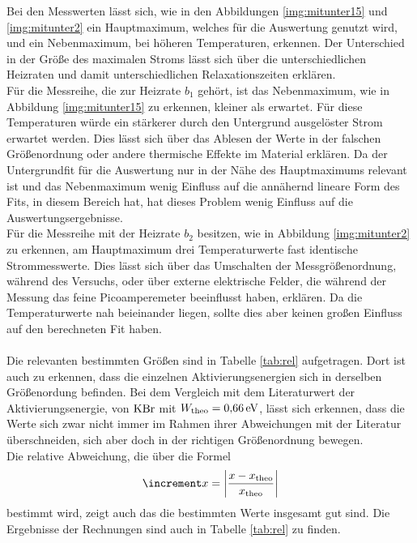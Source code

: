 \noindent
Bei den Messwerten lässt sich, wie in den Abbildungen \ref{img:mitunter15} und \ref{img:mitunter2} ein Hauptmaximum, welches für die Auswertung genutzt wird, 
und ein Nebenmaximum, bei höheren Temperaturen, erkennen.
Der Unterschied in der Größe des maximalen Stroms lässt sich über die unterschiedlichen Heizraten und damit unterschiedlichen Relaxationszeiten erklären.\\
Für die Messreihe, die zur Heizrate $b_1$ gehört, ist das Nebenmaximum, wie in Abbildung \ref{img:mitunter15} zu erkennen, kleiner als erwartet. 
Für diese Temperaturen würde ein stärkerer durch den Untergrund ausgelöster Strom erwartet werden. 
Dies lässt sich über das Ablesen der Werte in der falschen Größenordnung oder andere thermische Effekte im Material erklären.
Da der Untergrundfit für die Auswertung nur in der Nähe des Hauptmaximums relevant ist und das Nebenmaximum wenig Einfluss auf die annähernd lineare Form des Fits, in diesem Bereich hat, hat dieses Problem wenig Einfluss auf die Auswertungsergebnisse.  \\
Für die Messreihe mit der Heizrate $b_2$ besitzen, wie in Abbildung \ref{img:mitunter2} zu erkennen, am Hauptmaximum drei Temperaturwerte fast identische Strommesswerte.
Dies lässt sich über das Umschalten der Messgrößenordnung, während des Versuchs, oder über externe elektrische Felder, die während der Messung das feine Picoamperemeter beeinflusst haben, erklären.
Da die Temperaturwerte nah beieinander liegen, sollte dies aber keinen großen Einfluss auf den berechneten Fit haben. \\\\
Die relevanten bestimmten Größen sind in Tabelle \ref{tab:rel} aufgetragen. 
Dort ist auch zu erkennen, dass die einzelnen Aktivierungsenergien sich in derselben Größenordung befinden. 
Bei dem Vergleich mit dem Literaturwert der Aktivierungsenergie, von $\ce{KBr}$ mit $W_{\text{theo}} = \SI{0.66}{\electronvolt}$\cite{lit}, 
lässt sich erkennen, dass die Werte sich zwar nicht immer im Rahmen ihrer Abweichungen mit der Literatur überschneiden, sich aber doch in der richtigen Größenordnung bewegen.\\
Die relative Abweichung, die über die Formel  
\begin{equation*}
    \increment x = \left| \frac{x - x_\t{theo}}{x_\t{theo}} \right|
\end{equation*}
bestimmt wird, zeigt auch das die bestimmten Werte insgesamt gut sind. Die Ergebnisse der Rechnungen sind auch in Tabelle \ref{tab:rel} zu finden.

